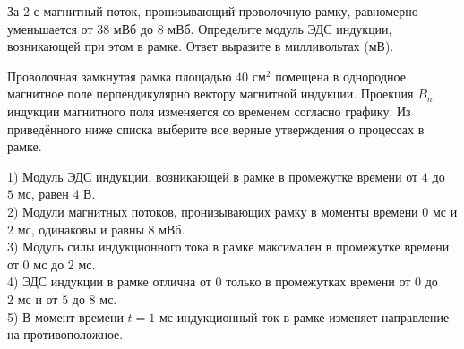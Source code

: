 \begin{taskbasic}[code={\label{task:elem_ind_v9_n12}}]
За $2\text{ с}$ магнитный поток, пронизывающий проволочную рамку, равномерно уменьшается от $38\text{ мВб}$ до $8\text{ мВб}$. Определите модуль ЭДС индукции, возникающей при этом в рамке. Ответ выразите в милливольтах (мВ).

\end{taskbasic}

\begin{taskbasic}[code={\label{task:elem_ind_v9_n14}}]
Проволочная замкнутая рамка площадью $40\text{ см}^2$ помещена в однородное магнитное поле перпендикулярно вектору магнитной индукции. Проекция $B_n$ индукции магнитного поля изменяется со временем согласно графику. Из приведённого ниже списка выберите все верные утверждения о процессах в рамке.

\nopagebreak\smallskip
\begin{center}
\end{center}

1) Модуль ЭДС индукции, возникающей в рамке в промежутке времени от $4$ до $5\text{ мс}$, равен $4\text{ В}$.\\
2) Модули магнитных потоков, пронизывающих рамку в моменты времени $0\text{ мс}$ и $2\text{ мс}$, одинаковы и равны $8\text{ мВб}$.\\
3) Модуль силы индукционного тока в рамке максимален в промежутке времени от $0\text{ мс}$ до $2\text{ мс}$.\\
4) ЭДС индукции в рамке отлична от $0$ только в промежутках времени от $0$ до $2\text{ мс}$ и от $5$ до $8\text{ мс}$.\\
5) В момент времени $t = 1\text{ мс}$ индукционный ток в рамке изменяет направление на противоположное.

\end{taskbasic}

